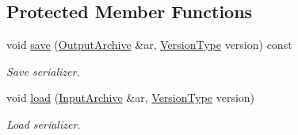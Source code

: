 \subsection*{Protected Member Functions}
\begin{DoxyCompactItemize}
\item 
void \hyperlink{classffnn_1_1layer_1_1internal_1_1_interface_a417d6fda112fdffed8091b0ebd78ed97}{save} (\hyperlink{classffnn_1_1traits_1_1_serializable_a08d986df75d363fa79506d4f6045cb9f}{Output\-Archive} \&ar, \hyperlink{classffnn_1_1traits_1_1_serializable_a08924b3b7d20cb3cb6eafe517d4f7b30}{Version\-Type} version) const 
\begin{DoxyCompactList}\small\item\em Save serializer. \end{DoxyCompactList}\item 
void \hyperlink{classffnn_1_1layer_1_1internal_1_1_interface_a88b5bd86aafd361d3a84dc6cba211195}{load} (\hyperlink{classffnn_1_1traits_1_1_serializable_a6e626759259f8f370dd4303b4441a234}{Input\-Archive} \&ar, \hyperlink{classffnn_1_1traits_1_1_serializable_a08924b3b7d20cb3cb6eafe517d4f7b30}{Version\-Type} version)
\begin{DoxyCompactList}\small\item\em Load serializer. \end{DoxyCompactList}\end{DoxyCompactItemize}
